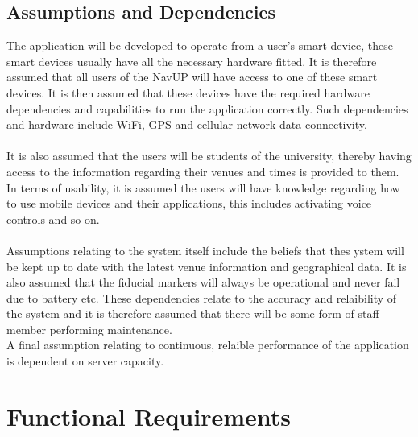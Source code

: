 \documentclass{article}
\begin{document}
	
	\subsection{Assumptions and Dependencies}
		The application will be developed to operate from a user's smart device, these smart devices usually have all the necessary hardware fitted. It is therefore assumed that all users of the NavUP will have access to one of these smart devices. It is then assumed that these devices have the required hardware dependencies and capabilities to run the application correctly. Such dependencies and hardware include WiFi, GPS and cellular network data connectivity.\\ \\
		It is also assumed that the users will be students of the university, thereby having access to the information regarding their venues and times is provided to them.\\
		In terms of usability, it is assumed the users will have knowledge regarding how to use mobile devices and their applications, this includes activating voice controls and so on. \\ \\
		Assumptions relating to the system itself include the beliefs that thes ystem will be kept up to date with the latest venue information and geographical data. It is also assumed that the fiducial markers will always be operational and never fail due to battery etc. These dependencies relate to the accuracy and relaibility of the system and it is therefore assumed that there will be some form of staff member performing maintenance.\\
		A final assumption relating to continuous, relaible performance of the application is dependent on server capacity.
		
		
		

\newpage
\section{Functional Requirements}
\end{document}
